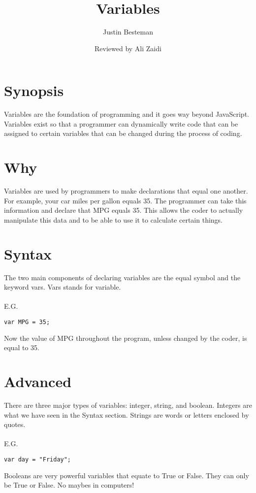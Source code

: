 \documentclass[12pt, letterpaper]{article}
\title{Variables}
\author{Justin Besteman}
\date{Reviewed by Ali Zaidi}
\begin{document}
\maketitle


\section*{Synopsis}

	 Variables are the foundation of programming and it goes way beyond JavaScript. Variables exist so that a programmer can dynamically write code that can be assigned to certain variables that can be changed during the process of coding. 

\section*{Why}

Variables are used by programmers to make declarations that equal one another.  For example, your car miles per gallon equals 35. The programmer can take this information and declare that MPG equals 35.  This allows the coder to actually manipulate this data and to be able to use it to calculate certain things. 

\section*{Syntax}

The two main components of declaring variables are the equal symbol and the keyword vars. Vars stands for variable. \\
\\
E.G.
\begin{lstlisting}
var MPG = 35;
\end{lstlisting}
Now the value of MPG throughout the program, unless changed by the coder, is equal to 35.

\section*{Advanced}

There are three major types of variables: integer, string, and boolean. Integers are what we have seen in the Syntax section. Strings are words or letters enclosed by quotes.\\ \\
E.G.
\begin{lstlisting}
var day = "Friday";
\end{lstlisting}
Booleans are very powerful variables that equate to True or False. They can only be True or False. No maybes in computers!
\end{document}
